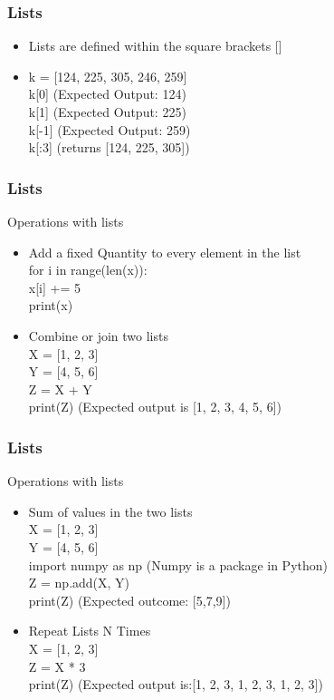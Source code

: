 \documentclass{beamer}
\theoremstyle{plain}
\theoremstyle{definition}
\begin{document}
\begin{frame}
      \frametitle{Lists}
			\begin{itemize}
			\item Lists are defined within the square brackets [] \\
			\item  k = [124, 225, 305, 246, 259] \\
                  k[0] (Expected Output: 124)\\
                  k[1] (Expected Output: 225)\\
                  k[-1] (Expected Output: 259) \\
                 k[:3] (returns [124, 225, 305]) \\
		 \end{itemize}
			

\end{frame} 

\begin{frame}
      \frametitle{Lists}
      Operations with lists
			\begin{itemize}
			\item Add a fixed Quantity to every element in the list \\
			for i in range(len(x)):\\
                   x[i] += 5 \\
                   print(x) \\
			\item Combine or join two lists\\
                  X = [1, 2, 3] \\
                   Y = [4, 5, 6] \\
Z = X + Y \\
print(Z) (Expected output is [1, 2, 3, 4, 5, 6]) \\ 
		 \end{itemize}
			

\end{frame}

\begin{frame}
      \frametitle{Lists}
      Operations with lists
			\begin{itemize}
			\item Sum of values in the two lists \\
			 X = [1, 2, 3] \\
             Y = [4, 5, 6] \\
import numpy as np (Numpy is a package in Python)\\
Z = np.add(X, Y) \\
print(Z) (Expected outcome: [5,7,9])
			\item Repeat Lists N Times\\
             X = [1, 2, 3] \\
Z = X * 3 \\
print(Z) (Expected output is:[1, 2, 3, 1, 2, 3, 1, 2, 3])
		 \end{itemize}
			

\end{frame}
\end{document}

